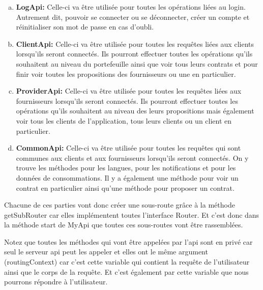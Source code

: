 \begin{enumerate}[a)]
\item \textbf{LogApi:}\newline
Celle-ci va être utilisée pour toutes les opérations liées au login. Autrement dit, pouvoir se connecter ou se déconnecter, créer un compte et réinitialiser son mot de passe en cas d'oubli.
\item \textbf{ClientApi:}\newline
Celle-ci va être utilisée pour toutes les requêtes liées aux clients lorsqu'ils seront connectés. Ils pourront effectuer toutes les opérations qu'ils souhaitent au niveau du portefeuille ainsi que voir tous leurs contrats et pour finir voir toutes les propositions des fournisseurs ou une en particulier.
\item \textbf{ProviderApi:}\newline
Celle-ci va être utilisée pour toutes les requêtes liées aux fournisseurs lorsqu'ils seront connectés. Ils pourront effectuer toutes les opérations qu'ils souhaitent au niveau des leurs propositions mais également voir tous les clients de l'application, tous leurs clients ou un client en particulier.
\item \textbf{CommonApi:}\newline
Celle-ci va être utilisée pour toutes les requêtes qui sont communes aux clients et aux fournisseurs lorsqu'ils seront connectés. On y trouve les méthodes pour les langues, pour les notifications et pour les données de consommations. Il y a également une méthode pour voir un contrat en particulier ainsi qu'une méthode pour proposer un contrat.
\end{enumerate}

\newpage

\begin{flushleft}
Chacune de ces parties vont donc créer une sous-route grâce à la méthode getSubRouter car elles implémentent toutes l'interface Router. Et c'est donc dans la méthode start de MyApi que toutes ces sous-routes vont être rassemblées.
\end{flushleft}

\begin{flushleft}
Notez que toutes les méthodes qui vont être appelées par l'api sont en privé car seul le serveur api peut les appeler et elles ont  le même argument (routingContext) car c'est cette variable qui contient la requête de l'utilisateur ainsi que le corps de la requête. Et c'est également par cette variable que nous pourrons répondre à l'utilisateur.
\end{flushleft}

